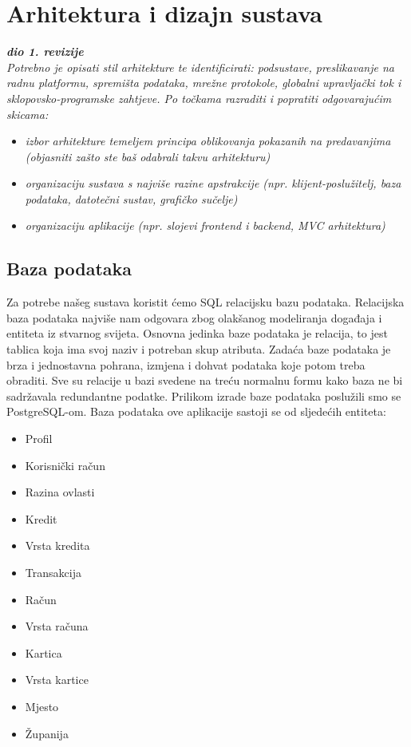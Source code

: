\chapter{Arhitektura i dizajn sustava}

		
		\textbf{\textit{dio 1. revizije}}\\

		\textit{ Potrebno je opisati stil arhitekture te identificirati: podsustave, preslikavanje na radnu platformu, spremišta podataka, mrežne protokole, globalni upravljački tok i sklopovsko-programske zahtjeve. Po točkama razraditi i popratiti odgovarajućim skicama:}
	\begin{itemize}
		\item 	\textit{izbor arhitekture temeljem principa oblikovanja pokazanih na predavanjima (objasniti zašto ste baš odabrali takvu arhitekturu)}
		\item 	\textit{organizaciju sustava s najviše razine apstrakcije (npr. klijent-poslužitelj, baza podataka, datotečni sustav, grafičko sučelje)}
		\item 	\textit{organizaciju aplikacije (npr. slojevi frontend i backend, MVC arhitektura) }		
	\end{itemize}

	
		

		

				
		\section{Baza podataka}
			
			
		Za potrebe našeg sustava koristit ćemo SQL relacijsku bazu podataka. Relacijska baza podataka najviše nam odgovara zbog olakšanog modeliranja događaja i entiteta iz stvarnog svijeta. Osnovna jedinka baze podataka je relacija, to jest tablica koja ima svoj naziv i potreban skup atributa. Zadaća baze podataka je brza i jednostavna pohrana, izmjena i dohvat podataka koje potom treba obraditi. Sve su relacije u bazi svedene na treću normalnu formu kako baza ne bi sadržavala redundantne podatke. Prilikom izrade baze podataka poslužili smo se PostgreSQL-om.
		Baza podataka ove aplikacije sastoji se od sljedećih entiteta:
		\begin{itemize}
			\item 	Profil
			\item 	Korisnički račun
			\item   Razina ovlasti
			\item   Kredit
			\item   Vrsta kredita
			\item   Transakcija
			\item   Račun
			\item   Vrsta računa
			\item   Kartica
			\item   Vrsta kartice	
			\item   Mjesto
			\item   Županija	
		\end{itemize}
		
